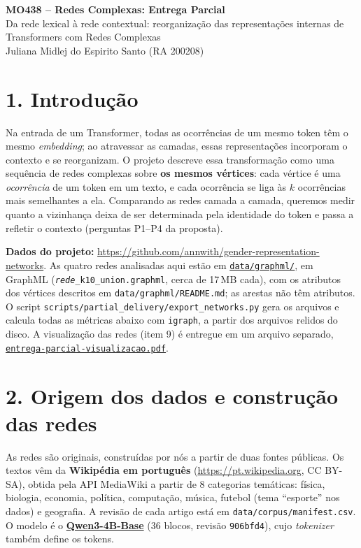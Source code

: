 \documentclass[11pt,a4paper]{article}
\newcommand{\repo}{https://github.com/annwith/gender-representation-networks}
\newcommand{\dados}{\repo/tree/main/data/graphml}
\newcommand{\visual}{\repo/blob/main/report/entrega-parcial-visualizacao/entrega-parcial-visualizacao.pdf}
\begin{document}
\begin{center}
    {\large\bfseries MO438 -- Redes Complexas: Entrega Parcial}\\[2pt]
    Da rede lexical à rede contextual: reorganização das representações
    internas de Transformers com Redes Complexas\\[2pt]
    Juliana Midlej do Espirito Santo (RA 200208)
\end{center}

\vspace{-2mm}

\section*{1. Introdução}

Na entrada de um Transformer, todas as ocorrências de um mesmo token têm o mesmo
\textit{embedding}; ao atravessar as camadas, essas representações incorporam o
contexto e se reorganizam. O projeto descreve essa transformação como uma sequência de
redes complexas sobre \textbf{os mesmos vértices}: cada vértice é uma
\textit{ocorrência} de um token em um texto, e cada ocorrência se liga às $k$ ocorrências
mais semelhantes a ela. Comparando as redes camada a camada, queremos medir quanto a
vizinhança deixa de ser determinada pela identidade do token e passa a refletir o
contexto (perguntas P1--P4 da proposta).

\textbf{Dados do projeto:} \url{\repo}. As quatro redes analisadas aqui estão em
\href{\dados}{\nolinkurl{data/graphml/}}, em GraphML (\texttt{\textit{rede}\_k10\_union.graphml},
cerca de 17\,MB cada), com os atributos dos vértices descritos em
\nolinkurl{data/graphml/README.md}; as arestas não têm atributos. O script
\nolinkurl{scripts/partial_delivery/export_networks.py} gera os arquivos e calcula todas as
métricas abaixo com \texttt{igraph}, a partir dos arquivos relidos do disco. A visualização das
redes (item 9) é entregue em um arquivo separado,
\href{\visual}{\texttt{entrega-parcial-visualizacao.pdf}}.

\section*{2. Origem dos dados e construção das redes}

As redes são originais, construídas por nós a partir de duas fontes públicas. Os textos vêm
da \textbf{Wikipédia em português} (\url{https://pt.wikipedia.org}, CC BY-SA), obtida pela
API MediaWiki a partir de 8 categorias temáticas: física, biologia, economia, política,
computação, música, futebol (tema ``esporte'' nos dados) e geografia. A revisão de cada
artigo está em \texttt{data/corpus/manifest.csv}. O modelo é o
\href{https://huggingface.co/Qwen/Qwen3-4B-Base}{\textbf{Qwen3-4B-Base}} (36 blocos, revisão
\texttt{906bfd4}), cujo \textit{tokenizer} também define os tokens.
\end{document}
